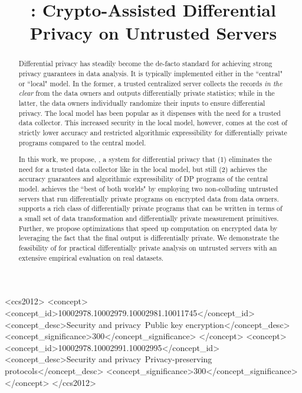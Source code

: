 \documentclass[sigconf]{acmart}
\begin{document}
\title{\system: Crypto-Assisted Differential Privacy on Untrusted Servers}
\author{}
\begin{abstract}
Differential privacy has steadily become the de-facto standard for achieving strong privacy guarantees in data analysis. It is typically implemented either in the ``central" or ``local" model. In the former, a trusted centralized server collects the records \textit{in the clear} from the data owners and outputs differentially private statistics; while in the latter, the data owners individually randomize their inputs to ensure differential privacy.  The local model has been popular as it dispenses with the need for a trusted data collector. This increased security in the local model, however, comes at the cost of strictly lower accuracy and restricted algorithmic expressibility for differentially private programs compared to the central model. 

In this work, we propose, \system, a  system for differential privacy that (1) eliminates the need for a trusted data collector like in the local model, but still (2) achieves the accuracy guarantees and algorithmic expressibility of DP programs of the central model. \system achieves the ``best of both worlds" by employing two non-colluding untrusted servers that run differentially private programs on encrypted data from data owners. \system 
supports a rich class of differentially private programs that can be written in terms of a small set of data transformation and differentially private measurement primitives. Further, we propose optimizations that speed up computation on encrypted data by leveraging the fact that the final output is differentially private. We demonstrate the feasibility of \system for practical differentially private analysis on untrusted servers with an extensive empirical evaluation on real datasets.
\end{abstract}
\begin{CCSXML}
<ccs2012>
<concept>
<concept_id>10002978.10002979.10002981.10011745</concept_id>
<concept_desc>Security and privacy~Public key encryption</concept_desc>
<concept_significance>300</concept_significance>
</concept>
<concept>
<concept_id>10002978.10002991.10002995</concept_id>
<concept_desc>Security and privacy~Privacy-preserving protocols</concept_desc>
<concept_significance>300</concept_significance>
</concept>
</ccs2012>
\end{CCSXML}
\end{document}
